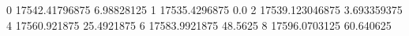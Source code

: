 0 17542.41796875 6.98828125
1 17535.4296875 0.0
2 17539.123046875 3.693359375
4 17560.921875 25.4921875
6 17583.9921875 48.5625
8 17596.0703125 60.640625
